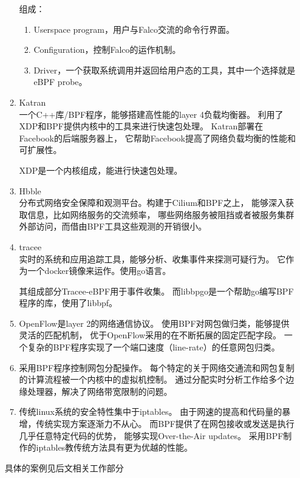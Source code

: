 \documentclass[AutoFakeBold,a4paper]{ctexart}
\begin{document}
\begin{itemize}
\begin{enumerate}
        组成：
        \begin{enumerate}
            \item Userspace program，用户与Falco交流的命令行界面。
            \item Configuration，控制Falco的运作机制。
            \item Driver，一个获取系统调用并返回给用户态的工具，其中一个选择就是eBPF probe。
        \end{enumerate}
        \item Katran\cite{Katran2021}\\
        一个C++库/BPF程序，能够搭建高性能的layer 4负载均衡器。
        利用了XDP和BPF提供内核中的工具来进行快速包处理。
        Katran部署在Facebook的后端服务器上，
        它帮助Facebook提高了网络负载均衡的性能和可扩展性。

        XDP是一个内核组成，能进行快速包处理。
        \item Hbble\cite{Hbble2021}\\
        分布式网络安全保障和观测平台。构建于Cilium和BPF之上，
        能够深入获取信息，比如网络服务的交流频率，
        哪些网络服务被阻挡或者被服务集群外部访问，而借由BPF工具这些观测的开销很小。
        \item tracee\cite{tracee2021}\\
        实时的系统和应用追踪工具，能够分析、收集事件来探测可疑行为。
        它作为一个docker镜像来运作。使用go语言。

        其组成部分Tracee-eBPF用于事件收集。
        而libbpgo是一个帮助go编写BPF程序的库，使用了libbpf。
        \item OpenFlow是layer 2的网络通信协议。\cite{7483106}
        使用BPF对网包做归类，能够提供灵活的匹配机制，
        优于OpenFlow采用的在不断拓展的固定匹配字段。
        一个复杂的BPF程序实现了一个端口速度（line-rate）的任意网包归类。
        \item 采用BPF程序控制网包分配操作。\cite{8407006}
        每个特定的关于网络交通流和网包复制的计算流程被一个内核中的虚拟机控制。
        通过分配实时分析工作给多个边缘处理器，解决了网络带宽限制的问题。
        \item 传统linux系统的安全特性集中于iptables。\cite{10.1145/3234200.3234228}
        由于网速的提高和代码量的暴增，传统实现方案逐渐力不从心。
        而BPF提供了在网包接收或发送是执行几乎任意特定代码的优势，
        能够实现Over-the-Air updates。
        采用BPF制作的iptables教传统方法具有更为优越的性能。
    \end{enumerate}
    具体的案例见后文相关工作部分


\end{itemize}
\end{document}
